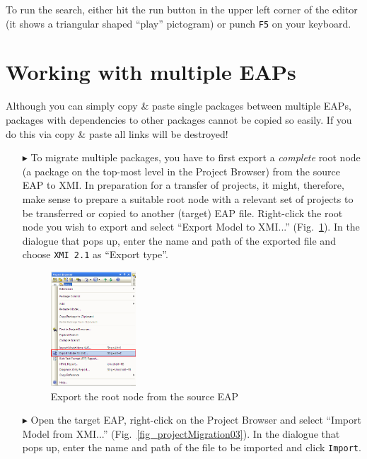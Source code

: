 To run the search, either hit the run button in the upper left corner of the
editor (it shows a triangular shaped ``play'' pictogram) or punch \texttt{F5} on your keyboard.

\section{Working with multiple EAPs} 

Although you can simply copy \& paste single packages between multiple EAPs, packages with dependencies to other packages cannot be copied so easily.
If you do this via copy \& paste all links will be destroyed!

\begin{enumerate}
\item[$\blacktriangleright$]
To migrate multiple packages, you have to first export a \emph{complete} root node (a package on the top-most level in the Project Browser) from the source EAP to XMI.
In preparation for a transfer of projects, it might, therefore, make sense to prepare a suitable root node with a relevant set of projects to be transferred or copied to another (target) EAP file.
Right-click the root node you wish to export and select ``Export Model to XMI...'' (Fig.~\ref{fig_projectMigration01}).
In the dialogue that pops up, enter the name and path of the exported file and choose \texttt{XMI 2.1} as ``Export type''.

\begin{figure}[htbp]
\begin{center}
  \includegraphics[width=0.3\textwidth]{pics/tricks/projectMigration/projectMigration1}
  \caption{Export the root node from the source EAP}  
  \label{fig_projectMigration01}
\end{center}
\end{figure}

\item[$\blacktriangleright$]
Open the target EAP, right-click on the Project Browser and select ``Import Model from XMI...'' (Fig.~\ref{fig_projectMigration03}). 
In the dialogue that pops up, enter the name and path of the file to be imported and click \texttt{Import}.


\end{enumerate}
